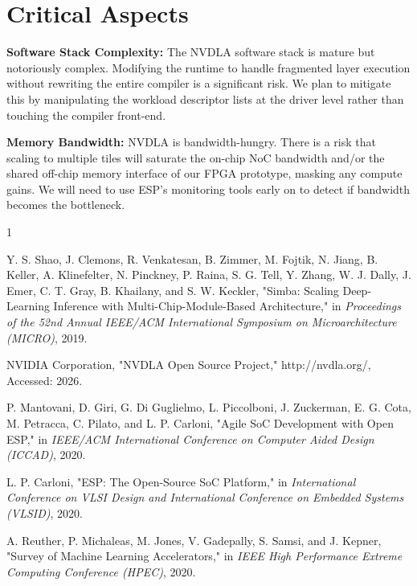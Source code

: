 \documentclass[10pt,sigconf,nonacm]{acmart}
\begin{document}
\section{Critical Aspects}
\textbf{Software Stack Complexity:} The NVDLA software stack is mature but notoriously complex. Modifying the runtime to handle fragmented layer execution without rewriting the entire compiler is a significant risk. We plan to mitigate this by manipulating the workload descriptor lists at the driver level rather than touching the compiler front-end.

\textbf{Memory Bandwidth:} NVDLA is bandwidth-hungry. There is a risk that scaling to multiple tiles will saturate the on-chip NoC bandwidth and/or the shared off-chip memory interface of our FPGA prototype, masking any compute gains. We will need to use ESP's monitoring tools early on to detect if bandwidth becomes the bottleneck.

\begin{thebibliography}{1}

Y. S. Shao, J. Clemons, R. Venkatesan, B. Zimmer, M. Fojtik, N. Jiang, B. Keller, A. Klinefelter, N. Pinckney, P. Raina, S. G. Tell, Y. Zhang, W. J. Dally, J. Emer, C. T. Gray, B. Khailany, and S. W. Keckler, "Simba: Scaling Deep-Learning Inference with Multi-Chip-Module-Based Architecture," in \emph{Proceedings of the 52nd Annual IEEE/ACM International Symposium on Microarchitecture (MICRO)}, 2019.

NVIDIA Corporation, "NVDLA Open Source Project," http://nvdla.org/, Accessed: 2026.

P. Mantovani, D. Giri, G. Di Guglielmo, L. Piccolboni, J. Zuckerman, E. G. Cota, M. Petracca, C. Pilato, and L. P. Carloni, "Agile SoC Development with Open ESP," in \emph{IEEE/ACM International Conference on Computer Aided Design (ICCAD)}, 2020.

L. P. Carloni, "ESP: The Open-Source SoC Platform," in \emph{International Conference on VLSI Design and International Conference on Embedded Systems (VLSID)}, 2020.

A. Reuther, P. Michaleas, M. Jones, V. Gadepally, S. Samsi, and J. Kepner, "Survey of Machine Learning Accelerators," in \emph{IEEE High Performance Extreme Computing Conference (HPEC)}, 2020.

\end{thebibliography}
\end{document}
